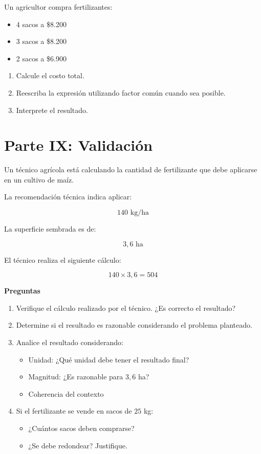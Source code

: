 \documentclass[12pt]{article}
\begin{document}
	Un agricultor compra fertilizantes:
	
	\begin{itemize}
		\item 4 sacos a \$8.200
		\item 3 sacos a \$8.200
		\item 2 sacos a \$6.900
	\end{itemize}
	
	\begin{enumerate}
		\item Calcule el costo total.
		\item Reescriba la expresión utilizando factor común cuando sea posible.
		\item Interprete el resultado.
	\end{enumerate}
	
	\newpage
	
	\vspace*{2em}
	
	\section*{Parte IX: Validación}
	
	Un técnico agrícola está calculando la cantidad de fertilizante que debe aplicarse en un cultivo de maíz.
	
	La recomendación técnica indica aplicar:
	
	\[
	140 \text{ kg/ha}
	\]
	
	La superficie sembrada es de:
	
	\[
	3{,}6 \text{ ha}
	\]
	
	El técnico realiza el siguiente cálculo:
	
	\[
	140 \times 3{,}6 = 504
	\]
	
	\textbf{Preguntas}
	
	\begin{enumerate}
		\item Verifique el cálculo realizado por el técnico. ¿Es correcto el resultado?
		\item Determine si el resultado es razonable considerando el problema planteado.
		\item Analice el resultado considerando:
		\begin{itemize}
			\item Unidad: ¿Qué unidad debe tener el resultado final?
			\item Magnitud: ¿Es razonable para $3{,}6$ ha?
			\item Coherencia del contexto
		\end{itemize}
		\item Si el fertilizante se vende en sacos de $25$ kg:
		\begin{itemize}
			\item ¿Cuántos sacos deben comprarse?
			\item ¿Se debe redondear? Justifique.
		\end{itemize}
	\end{enumerate}
	
\end{document}
